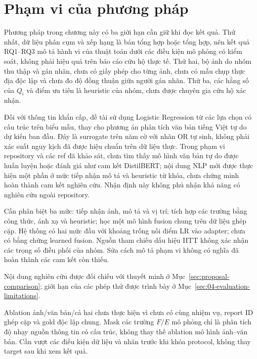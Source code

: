 \section{Phạm vi của phương pháp}\label{sec:02-scope}
Phương pháp trong chương này có ba giới hạn cần giữ khi đọc kết quả. Thứ nhất, dữ liệu phân cụm và xếp hạng là bán tổng hợp hoặc tổng hợp, nên kết quả RQ1--RQ3 mô tả hành vi của thuật toán dưới các điều kiện mô phỏng có kiểm soát, không phải hiệu quả trên báo cáo cứu hộ thực tế. Thứ hai, bộ ảnh do nhóm thu thập và gán nhãn, chưa có giấy phép cho từng ảnh, chưa có mẫu chụp thực địa độc lập và chưa đo độ đồng thuận giữa người gán nhãn. Thứ ba, các hằng số của $Q_i$ và điểm ưu tiên là heuristic của nhóm, chưa được chuyên gia cứu hộ xác nhận.

Đối với thông tin khẩn cấp, đề tài sử dụng Logistic Regression từ các lựa chọn có cấu trúc trên biểu mẫu, thay cho phương án phân tích văn bản tiếng Việt tự do dự kiến ban đầu. Đây là surrogate trên năm cờ với nhãn OR tự sinh, không phải xác suất nguy kịch đã được hiệu chuẩn trên dữ liệu thực. Trong phạm vi repository và các ref đã khảo sát, chưa tìm thấy mô hình văn bản tự do được huấn luyện hoặc đánh giá như cam kết DistilBERT; nội dung NLP mới được thực hiện một phần ở mức tiếp nhận mô tả và heuristic từ khóa, chưa chứng minh hoàn thành cam kết nghiên cứu. Nhận định này không phủ nhận khả năng có nghiên cứu ngoài repository.

Cần phân biệt ba mức: tiếp nhận ảnh, mô tả và vị trí; tích hợp các trường bằng công thức, ánh xạ và heuristic; học một mô hình fusion chung trên dữ liệu ghép cặp. Hệ thống có hai mức đầu với khoảng trống nối điểm LR vào adapter; chưa có bằng chứng learned fusion. Nguồn tham chiếu dấu hiệu IITT không xác nhận các trọng số điều phối của nhóm. Sửa cách mô tả phạm vi không có nghĩa đã hoàn thành các cam kết còn thiếu.

Nội dung nghiên cứu được đối chiếu với thuyết minh ở Mục~\ref{sec:proposal-comparison}; giới hạn của các phép thử được trình bày ở Mục~\ref{sec:04-evaluation-limitations}.

Ablation ảnh/văn bản/cả hai chưa thực hiện vì chưa có cùng nhiệm vụ, report ID ghép cặp và gold độc lập chung. Mask các trường $F/E$ mô phỏng chỉ là phân tích độ nhạy nguồn thông tin có cấu trúc, không thay thế ablation mô hình ảnh--văn bản. Cần vượt các điều kiện dữ liệu và nhãn trước khi khóa protocol, không thay target sau khi xem kết quả.
